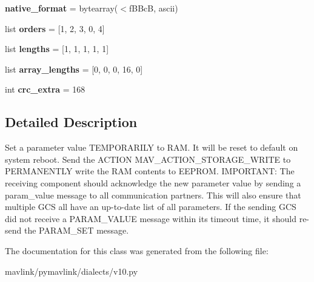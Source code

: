\begin{DoxyCompactItemize}
\mbox{\label{classpymavlink_1_1dialects_1_1v10_1_1MAVLink__param__set__message_a7220d8593327a7a5895514d7ab8533fc}} 
{\bfseries native\+\_\+format} = bytearray(\textquotesingle{}$<$f\+B\+BcB\textquotesingle{}, \textquotesingle{}ascii\textquotesingle{})
\item 
\mbox{\label{classpymavlink_1_1dialects_1_1v10_1_1MAVLink__param__set__message_a2596e4961f85fc8ed258fde7c2e34566}} 
list {\bfseries orders} = \mbox{[}1, 2, 3, 0, 4\mbox{]}
\item 
\mbox{\label{classpymavlink_1_1dialects_1_1v10_1_1MAVLink__param__set__message_a0b91b36abbe8017a560f4fb8169a6a41}} 
list {\bfseries lengths} = \mbox{[}1, 1, 1, 1, 1\mbox{]}
\item 
\mbox{\label{classpymavlink_1_1dialects_1_1v10_1_1MAVLink__param__set__message_ac8d67c425331c6393c733e6ae82875e0}} 
list {\bfseries array\+\_\+lengths} = \mbox{[}0, 0, 0, 16, 0\mbox{]}
\item 
\mbox{\label{classpymavlink_1_1dialects_1_1v10_1_1MAVLink__param__set__message_a0ed2cc19768c4bb31c36d6f54b6cce9c}} 
int {\bfseries crc\+\_\+extra} = 168
\end{DoxyCompactItemize}


\subsection{Detailed Description}
\begin{DoxyVerb}Set a parameter value TEMPORARILY to RAM. It will be reset to
default on system reboot. Send the ACTION
MAV_ACTION_STORAGE_WRITE to PERMANENTLY write the RAM contents
to EEPROM. IMPORTANT: The receiving component should
acknowledge the new parameter value by sending a param_value
message to all communication partners. This will also ensure
that multiple GCS all have an up-to-date list of all
parameters. If the sending GCS did not receive a PARAM_VALUE
message within its timeout time, it should re-send the
PARAM_SET message.
\end{DoxyVerb}
 

The documentation for this class was generated from the following file\+:\begin{DoxyCompactItemize}
\item 
mavlink/pymavlink/dialects/v10.\+py\end{DoxyCompactItemize}
